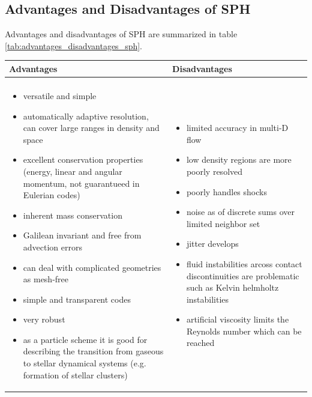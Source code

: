 \subsection{Advantages and Disadvantages of SPH}
Advantages and disadvantages of SPH are summarized in table \ref{tab:advantages_disadvantages_sph}.

\begin{table}[!htb]
    \centering
    \begin{tabular}{p{}|p{}}
        \textcolor{green1}{Advantages} & \textcolor{red1}{Disadvantages} \\
        \hline \\
        \begin{itemize}
            \item versatile and simple
            \item automatically adaptive resolution, can cover large ranges in density and space
            \item excellent conservation properties (energy, linear and angular momentum, not guarantueed in Eulerian codes)
            \item inherent mass conservation
            \item Galilean invariant and free from advection errors
            \item can deal with complicated geometries as mesh-free
            \item simple and transparent codes
            \item very robust
            \item as a particle scheme it is good for describing the transition from gaseous to stellar dynamical systems (e.g. formation of stellar clusters)
        \end{itemize} &
        \begin{itemize}
            \item limited accuracy in multi-D flow
            \item low density regions are more poorly resolved
            \item poorly handles shocks
            \item noise as of discrete sums over limited neighbor set
            \item jitter develops
            \item fluid instabilities arcoss contact discontinuities are problematic such as Kelvin helmholtz instabilities
            \item artificial viscosity limits the Reynolds number which can be reached

\end{itemize}
\end{tabular}
\end{table}
